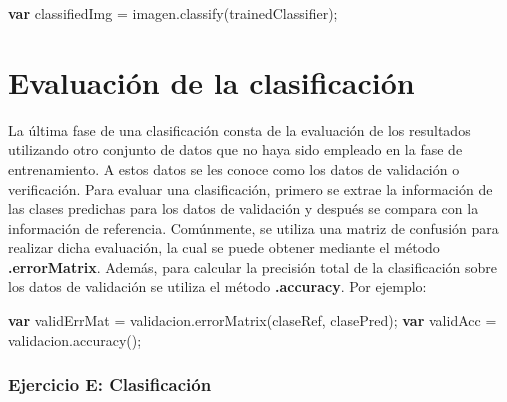 \documentclass[
  12pt,
  letterpaper,
  twoside]{book}
\newenvironment{Shaded}{\begin{snugshade}}{\end{snugshade}}
\newcommand{\FunctionTok}[1]{\textcolor[rgb]{0.48,0.12,0.64}{#1}}
\newcommand{\KeywordTok}[1]{\textcolor[rgb]{0.00,0.00,0.00}{\textbf{#1}}}
\newcommand{\NormalTok}[1]{#1}
\newcommand{\OperatorTok}[1]{\textcolor[rgb]{0.00,0.00,0.00}{#1}}
\newcommand{\StringTok}[1]{\textcolor[rgb]{0.87,0.29,0.22}{#1}}
\newcommand\boldpurple[1]{\textcolor{darkpurple}{\textbf{#1}}}
\begin{document}
\begin{Shaded}
\begin{Highlighting}[]
\KeywordTok{var}\NormalTok{ classifiedImg }\OperatorTok{=}\NormalTok{ imagen}\OperatorTok{.}\FunctionTok{classify}\NormalTok{(trainedClassifier)}\OperatorTok{;}
\end{Highlighting}
\end{Shaded}

\hypertarget{evaluaciuxf3n-de-la-clasificaciuxf3n}{%
\section{Evaluación de la clasificación}\label{evaluaciuxf3n-de-la-clasificaciuxf3n}}

La última fase de una clasificación consta de la evaluación de los resultados utilizando otro conjunto de datos que no haya sido empleado en la fase de entrenamiento. A estos datos se les conoce como los datos de validación o verificación. Para evaluar una clasificación, primero se extrae la información de las clases predichas para los datos de validación y después se compara con la información de referencia. Comúnmente, se utiliza una matriz de confusión para realizar dicha evaluación, la cual se puede obtener mediante el método \boldpurple{.errorMatrix}. Además, para calcular la precisión total de la clasificación sobre los datos de validación se utiliza el método \boldpurple{.accuracy}. Por ejemplo:

\begin{Shaded}
\begin{Highlighting}[]
\KeywordTok{var}\NormalTok{ validErrMat }\OperatorTok{=}\NormalTok{ validacion}\OperatorTok{.}\FunctionTok{errorMatrix}\NormalTok{(}\StringTok{\textquotesingle{}claseRef\textquotesingle{}}\OperatorTok{,} \StringTok{\textquotesingle{}clasePred\textquotesingle{}}\NormalTok{)}\OperatorTok{;}
\KeywordTok{var}\NormalTok{ validAcc }\OperatorTok{=}\NormalTok{ validacion}\OperatorTok{.}\FunctionTok{accuracy}\NormalTok{()}\OperatorTok{;}
\end{Highlighting}
\end{Shaded}

\hypertarget{ejercicio-e-clasificaciuxf3n}{%
\subsubsection*{Ejercicio E: Clasificación}\label{ejercicio-e-clasificaciuxf3n}}
\end{document}
